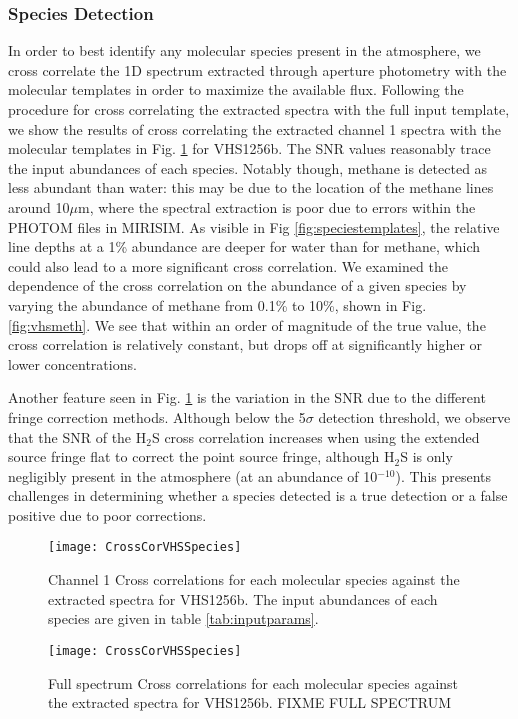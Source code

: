 \subsubsection{Species Detection}
In order to best identify any molecular species present in the atmosphere, we cross correlate the 1D spectrum extracted through aperture photometry with the molecular templates in order to maximize the available flux.
Following the procedure for cross correlating the extracted spectra with the full input template, we show the results of cross correlating the extracted channel 1 spectra with the molecular templates in Fig. \ref{fig:ccspecvhs} for VHS1256b.
The SNR values reasonably trace the input abundances of each species.
Notably though, methane is detected as less abundant than water: this may be due to the location of the methane lines around 10$\mu$m, where the spectral extraction is poor due to errors within the PHOTOM files in MIRISIM.
As visible in Fig \ref{fig:speciestemplates}, the relative line depths at a 1\% abundance are deeper for water than for methane, which could also lead to a more significant cross correlation.
We examined the dependence of the cross correlation on the abundance of a given species by varying the abundance of methane from 0.1\% to 10\%, shown in Fig. \ref{fig:vhsmeth}.
We see that within an order of magnitude of the true value, the cross correlation is relatively constant, but drops off at significantly higher or lower concentrations.

Another feature seen in Fig. \ref{fig:ccspecvhs} is the variation in the SNR due to the different fringe correction methods. 
Although below the 5$\sigma$ detection threshold, we observe that the SNR of the H$_{2}$S cross correlation increases when using the extended source fringe flat to correct the point source fringe, although H$_{2}$S is only negligibly present in the atmosphere (at an abundance of 10$^{-10}$).
This presents challenges in determining whether a species detected is a true detection or a false positive due to poor corrections.
\begin{figure}[t]
	\texttt{[image: CrossCorVHSSpecies]}
	\caption{Channel 1 Cross correlations for each molecular species against the extracted spectra for VHS1256b. The input abundances of each species are given in table \ref{tab:inputparams}. }
	\label{fig:ccspecvhs}
\end{figure}
\begin{figure}[h]
	\texttt{[image: CrossCorVHSSpecies]}
	\caption{Full spectrum Cross correlations for each molecular species against the extracted spectra for VHS1256b. FIXME FULL SPECTRUM }
	\label{fig:ccspecvhsfull}
\end{figure}

